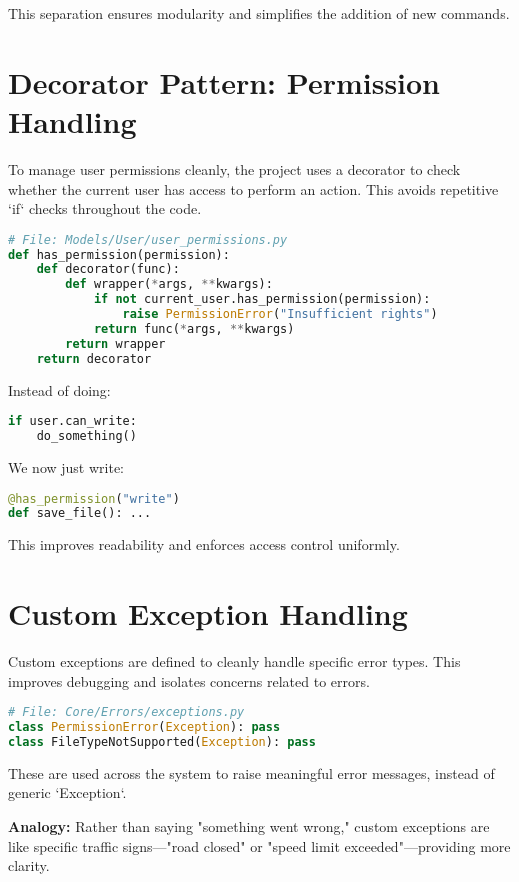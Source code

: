 \documentclass[12pt]{article}
\begin{document}
This separation ensures modularity and simplifies the addition of new commands.

\newpage

\section{Decorator Pattern: Permission Handling}
To manage user permissions cleanly, the project uses a decorator to check whether the current user has access to perform an action. This avoids repetitive `if` checks throughout the code.

\begin{lstlisting}[language=Python]
# File: Models/User/user_permissions.py
def has_permission(permission):
    def decorator(func):
        def wrapper(*args, **kwargs):
            if not current_user.has_permission(permission):
                raise PermissionError("Insufficient rights")
            return func(*args, **kwargs)
        return wrapper
    return decorator
\end{lstlisting}

Instead of doing:
\begin{lstlisting}[language=Python]
if user.can_write:
    do_something()
\end{lstlisting}

We now just write:
\begin{lstlisting}[language=Python]
@has_permission("write")
def save_file(): ...
\end{lstlisting}

This improves readability and enforces access control uniformly.

\section{Custom Exception Handling}
Custom exceptions are defined to cleanly handle specific error types. This improves debugging and isolates concerns related to errors.

\begin{lstlisting}[language=Python]
# File: Core/Errors/exceptions.py
class PermissionError(Exception): pass
class FileTypeNotSupported(Exception): pass
\end{lstlisting}

These are used across the system to raise meaningful error messages, instead of generic `Exception`.

\textbf{Analogy:} Rather than saying "something went wrong," custom exceptions are like specific traffic signs—"road closed" or "speed limit exceeded"—providing more clarity.
\end{document}
